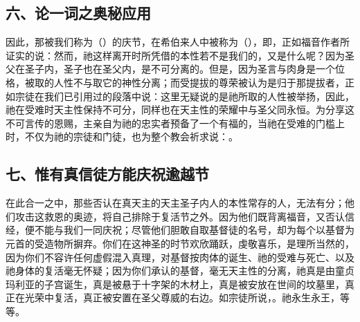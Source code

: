 
\subsection{六、论一词之奥秘应用}

因此，那被我们称为（）的庆节，在希伯来人中被称为（），即，正如福音作者所证实的说：然而，祂这样离开时所凭借的本性若不是我们的，又是什么呢？因为圣父在圣子内，圣子也在圣父内，是不可分离的。但是，因为圣言与肉身是一个位格，被取的人性不与取它的神性分离；而受提拔的尊荣被认为是归于那提拔者，正如宗徒在我们已引用过的段落中说：这里无疑说的是祂所取的人性被举扬，因此，祂在受难时天主性保持不可分，同样也在天主性的荣耀中与圣父同永恒。为分享这不可言传的恩赐，主亲自为祂的忠实者预备了一个有福的，当祂在受难的门槛上时，不仅为祂的宗徒和门徒，也为整个教会祈求说：。\par


\subsection{七、惟有真信徒方能庆祝逾越节}

在此合一之中，那些否认在真天主的天主圣子内人的本性常存的人，无法有分；他们攻击这救恩的奥迹，将自己排除于复活节之外。因为他们既背离福音，又否认信经，便不能与我们一同庆祝；尽管他们胆敢自取基督徒的名号，却为每个以基督为元首的受造物所摒弃。你们在这神圣的时节欢欣踊跃，虔敬喜乐，是理所当然的，因为你们不容许任何虚假混入真理，对基督按肉体的诞生、祂的受难与死亡、以及祂身体的复活毫无怀疑；因为你们承认的基督，毫无天主性的分离，祂真是由童贞玛利亚的子宫诞生，真是被悬于十字架的木材上，真是被安放在世间的坟墓里，真正在光荣中复活，真正被安置在圣父尊威的右边。如宗徒所说，。祂永生永王，等等。\par


